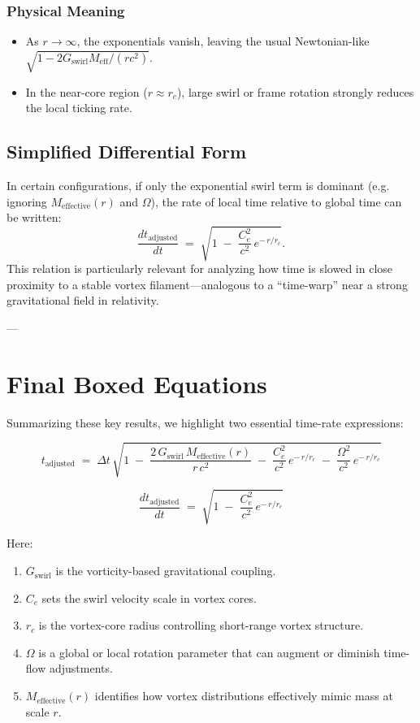 \subsubsection{Physical Meaning}
\begin{itemize}
    \item As \(r \to \infty\), the exponentials vanish, leaving the usual Newtonian-like \(\sqrt{1 - 2G_{\text{swirl}} M_{\text{eff}} / (rc^2)}\).
    \item In the near-core region (\(r \approx r_c\)), large swirl or frame rotation strongly reduces the local ticking rate.
\end{itemize}

\subsection{Simplified Differential Form}
In certain configurations, if only the exponential swirl term is dominant (e.g. ignoring \(M_{\text{effective}}(r)\) and \(\Omega\)), the rate of local time relative to global time can be written:
\[
    \frac{d t_{\text{adjusted}}}{d t}
    \;=\;
    \sqrt{1 \;-\; \frac{C_e^2}{c^2}\, e^{-\,r/r_c}}.
\]
This relation is particularly relevant for analyzing how time is slowed in close proximity to a stable vortex filament—analogous to a “time-warp” near a strong gravitational field in relativity.

---

\section{Final Boxed Equations}

Summarizing these key results, we highlight two essential time-rate expressions:

\[
    \boxed{
        t_{\text{adjusted}}
        \;=\;
        \Delta t \,\sqrt{
            1
            \;-\; \frac{2\,G_{\text{swirl}}\,M_{\text{effective}}(r)}{r\,c^2}
            \;-\; \frac{C_e^2}{c^2}\, e^{-\,r/r_c}
            \;-\; \frac{\Omega^2}{c^2}\, e^{-\,r/r_c}
        }
    }
\]

\[
    \boxed{
        \frac{d t_{\text{adjusted}}}{d t}
        \;=\;
        \sqrt{1 \;-\; \frac{C_e^2}{c^2}\, e^{-\,r/r_c}}
    }
\]

Here:
\begin{enumerate}
    \item \(G_{\text{swirl}}\) is the vorticity-based gravitational coupling.
    \item \(C_e\) sets the swirl velocity scale in vortex cores.
    \item \(r_c\) is the vortex-core radius controlling short-range vortex structure.
    \item \(\Omega\) is a global or local rotation parameter that can augment or diminish time-flow adjustments.
    \item \(M_{\text{effective}}(r)\) identifies how vortex distributions effectively mimic mass at scale \(r\).
\end{enumerate}

